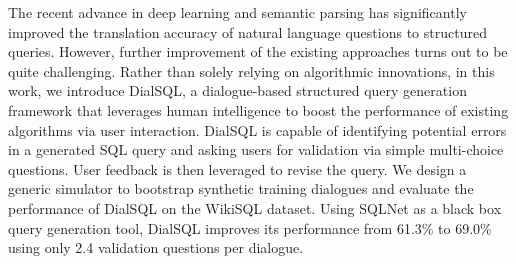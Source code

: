 The recent advance in deep learning and semantic parsing has significantly improved the translation accuracy of natural language questions to structured queries. However, further improvement of the existing approaches turns out to be quite challenging. Rather than solely relying on algorithmic innovations, in this work, we introduce DialSQL, a dialogue-based structured query generation framework that leverages human intelligence to boost the performance of existing algorithms via user interaction. DialSQL is capable of identifying potential errors in a generated SQL query and asking users for validation via simple multi-choice questions. User feedback is then leveraged to revise the query. We design a generic simulator to bootstrap synthetic training dialogues and evaluate the performance of DialSQL on the WikiSQL dataset. Using SQLNet as a black box query generation tool, DialSQL improves its performance from 61.3\% to 69.0\% using only 2.4 validation questions per dialogue.

